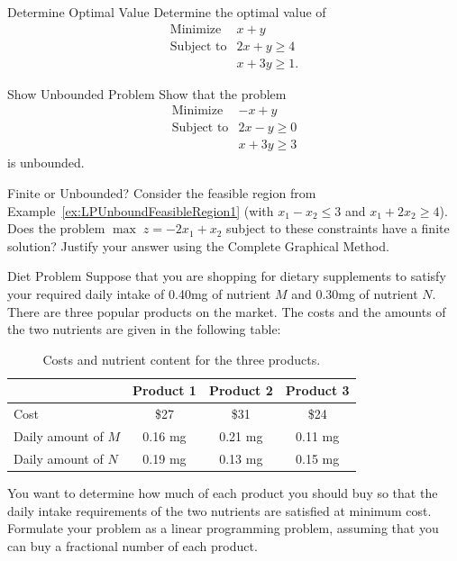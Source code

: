 \begin{ex}{Determine Optimal Value}{}\label{ex:lp-optimal-value}
Determine the optimal value of
\[
\begin{array}{rl}
\text{Minimize} & x + y \\
\text{Subject to} &  2x + y \geq 4 \\
& x + 3y \geq 1.
\end{array}
\]
\exrefs{\S\ref{sec:graphical-approach}}
\end{ex}

\begin{ex}{Show Unbounded Problem}{}\label{ex:lp-unbounded}
Show that the problem
\[
\begin{array}{rl}
\text{Minimize} & -x + y \\
\text{Subject to} &  2x - y \geq 0 \\
& x + 3y \geq 3
\end{array}
\]
is unbounded.
\end{ex}

\begin{ex}{Finite or Unbounded?}{}\label{exer:BoundedSolutionQuestion}
Consider the feasible region from Example~\ref{ex:LPUnboundFeasibleRegion1} (with $x_1-x_2\leq 3$ and $x_1+2x_2\geq 4$). Does the problem $\max\; z = -2x_1 + x_2$ subject to these constraints have a finite solution? Justify your answer using the Complete Graphical Method.
\end{ex}

\begin{ex}{Diet Problem}{}\label{ex:lp-diet-problem}
Suppose that you are shopping for dietary supplements to satisfy your
required daily intake of 0.40mg of nutrient \(M\) and 0.30mg of
nutrient \(N\). There are three popular products on the market. The
costs and the amounts of the two nutrients are given in the following
table:

\begin{table}[h!]
\centering
\begin{tabular}{lccc}
\toprule
         & Product 1 & Product 2 & Product 3 \\ \midrule
Cost     & \$27      & \$31      & \$24      \\
Daily amount of \(M\) & 0.16 mg   & 0.21 mg   & 0.11 mg   \\
Daily amount of \(N\) & 0.19 mg   & 0.13 mg   & 0.15 mg   \\ \bottomrule
\end{tabular}
\caption{Costs and nutrient content for the three products.}
\label{tab:diet-problem-data}
\end{table}

You want to determine how much of each product you should buy so that
the daily intake requirements of the two nutrients are satisfied at
minimum cost. Formulate your problem as a linear programming problem,
assuming that you can buy a fractional number of each product.
\end{ex}

